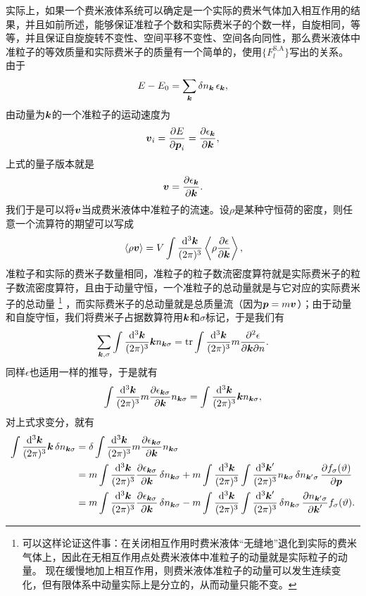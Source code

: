 \documentclass[hyperref, UTF8, a4paper]{ctexart}
\begin{document}
实际上，如果一个费米液体系统可以确定是一个实际的费米气体加入相互作用的结果，并且如前所述，能够保证准粒子个数和实际费米子的个数一样，自旋相同，等等，并且保证自旋旋转不变性、空间平移不变性、空间各向同性，那么费米液体中准粒子的等效质量和实际费米子的质量有一个简单的，使用$\{F_l^\text{S,A}\}$写出的关系。
由于
\[
    E - E_0 = \sum_{\vb*{k}} \var{n_{\vb*{k}}} \epsilon_{\vb*{k}},
\]
由动量为$\vb*{k}$的一个准粒子的运动速度为
\[
    \vb*{v}_i = \pdv{E}{\vb*{p}_i} = \pdv{\epsilon_{\vb*{k}}}{\vb*{k}},
\]
上式的量子版本就是
\[
    {\vb*{v}} = \pdv{{\epsilon}_{\vb*{k}}}{\vb*{k}}.
\]
我们于是可以将${\vb*{v}}$当成费米液体中准粒子的流速。设$\rho$是某种守恒荷的密度，则任意一个流算符的期望可以写成
\[
    \begin{aligned}
        \expval*{\rho \vb*{v}} = V \int \frac{\dd[3]{\vb*{k}}}{(2\pi)^3} \expval{\rho \pdv{{\epsilon}}{\vb*{k}}} , 
    \end{aligned}
\]
准粒子和实际的费米子数量相同，准粒子的粒子数流密度算符就是实际费米子的粒子数流密度算符，且由于动量守恒，一个准粒子的总动量就是与它对应的实际费米子的总动量%
\footnote{
    可以这样论证这件事：在关闭相互作用时费米液体“无缝地”退化到实际的费米气体上，因此在无相互作用点处费米液体中准粒子的动量就是实际粒子的动量。
    现在缓慢地加上相互作用，则费米液体准粒子的动量可以发生连续变化，但有限体系中动量实际上是分立的，从而动量只能不变。
}%
，而实际费米子的总动量就是总质量流（因为$\vb*{p}=m\vb*{v}$）；由于动量和自旋守恒，我们将费米子占据数算符用$\vb*{k}$和$\sigma$标记，于是我们有
\[
    \sum_{\vb*{k}, \sigma} \int \frac{\dd[3]{\vb*{k}}}{(2\pi)^3} \vb*{k} {n}_{\vb*{k} \sigma} = \trace \int \frac{\dd[3]{\vb*{k}}}{(2\pi)^3} m \pdv{{\epsilon}}{\vb*{k}} {n}.
\]
同样${\epsilon}$也适用一样的推导，于是就有
\[
    \int \frac{\dd[3]{\vb*{k}}}{(2\pi)^3} m \pdv{\epsilon_{\vb*{k} \sigma}}{\vb*{k}} n_{\vb*{k} \sigma} = \int \frac{\dd[3]{\vb*{k}}}{(2\pi)^3} \vb*{k} n_{\vb*{k} \sigma},
\]
对上式求变分，就有
\[
    \begin{aligned}
        \int \frac{\dd[3]{\vb*{k}}}{(2\pi)^3} \vb*{k} \var{n_{\vb*{k} \sigma}} &= \var \int \frac{\dd[3]{\vb*{k}}}{(2\pi)^3} m \pdv{\epsilon_{\vb*{k} \sigma}}{\vb*{k}} n_{\vb*{k} \sigma} \\
        &= m \int \frac{\dd[3]{\vb*{k}}}{(2\pi)^3} \pdv{\epsilon_{\vb*{k} \sigma}}{\vb*{k}} \var{n_{\vb*{k} \sigma}} + m \int \frac{\dd[3]{\vb*{k}}}{(2\pi)^3} \int \frac{\dd[3]{\vb*{k}'}}{(2\pi)^3} n_{\vb*{k} \sigma} \var{n_{\vb*{k}' \sigma}} \pdv{f_{\sigma}(\vartheta)}{\vb*{p}} \\
        &= m \int \frac{\dd[3]{\vb*{k}}}{(2\pi)^3} \pdv{\epsilon_{\vb*{k} \sigma}}{\vb*{k}} \var{n_{\vb*{k} \sigma}} - m \int \frac{\dd[3]{\vb*{k}}}{(2\pi)^3} \int \frac{\dd[3]{\vb*{k}'}}{(2\pi)^3} \var{n_{\vb*{k} \sigma}} \pdv{n_{\vb*{k}' \sigma}}{\vb*{k}'} f_{\sigma}(\vartheta) .
    \end{aligned}
\]
\end{document}
